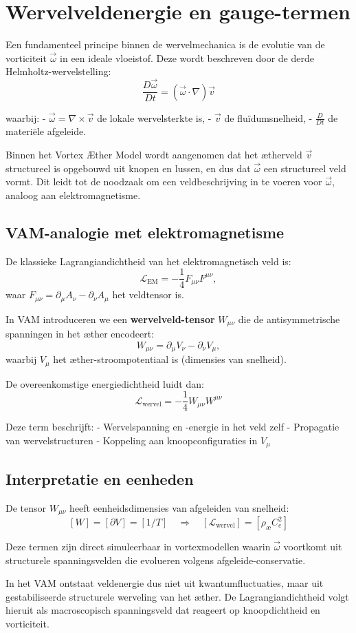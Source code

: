 \section{Wervelveldenergie en gauge-termen}

Een fundamenteel principe binnen de wervelmechanica is de evolutie van de vorticiteit $\vec{\omega}$ in een ideale vloeistof. Deze wordt beschreven door de derde Helmholtz-wervelstelling:
\[
    \frac{D \vec{\omega}}{Dt} = (\vec{\omega} \cdot \nabla) \vec{v}
\]

waarbij:
- $\vec{\omega} = \nabla \times \vec{v}$ de lokale wervelsterkte is,
- $\vec{v}$ de fluïdumsnelheid,
- $\frac{D}{Dt}$ de materiële afgeleide.

Binnen het Vortex Æther Model wordt aangenomen dat het ætherveld $\vec{v}$ structureel is opgebouwd uit knopen en lussen, en dus dat $\vec{\omega}$ een structureel veld vormt. Dit leidt tot de noodzaak om een veldbeschrijving in te voeren voor $\vec{\omega}$, analoog aan elektromagnetisme.

\subsection*{VAM-analogie met elektromagnetisme}
De klassieke Lagrangiandichtheid van het elektromagnetisch veld is:
\[
    \mathcal{L}_\text{EM} = -\frac{1}{4} F_{\mu\nu} F^{\mu\nu},
\]
waar $F_{\mu\nu} = \partial_\mu A_\nu - \partial_\nu A_\mu$ het veldtensor is.

In VAM introduceren we een \textbf{wervelveld-tensor} $W_{\mu\nu}$ die de antisymmetrische spanningen in het æther encodeert:
\[
    W_{\mu\nu} = \partial_\mu V_\nu - \partial_\nu V_\mu,
\]
waarbij $V_\mu$ het æther-stroompotentiaal is (dimensies van snelheid).

De overeenkomstige energiedichtheid luidt dan:
\[
    \mathcal{L}_\text{wervel} = -\frac{1}{4} W_{\mu\nu} W^{\mu\nu}
\]

Deze term beschrijft:
- Wervelspanning en -energie in het veld zelf
- Propagatie van wervelstructuren
- Koppeling aan knoopconfiguraties in $V_\mu$

\subsection*{Interpretatie en eenheden}
De tensor $W_{\mu\nu}$ heeft eenheidsdimensies van afgeleiden van snelheid:
\[
    [W] = [\partial V] = [1/T] \quad \Rightarrow \quad [\mathcal{L}_\text{wervel}] = [\rho_\text{\ae} C_e^2]
\]

Deze termen zijn direct simuleerbaar in vortexmodellen waarin $\vec{\omega}$ voortkomt uit structurele spanningsvelden die evolueren volgens afgeleide-conservatie.

In het VAM ontstaat veldenergie dus niet uit kwantumfluctuaties, maar uit gestabiliseerde structurele werveling van het æther. De Lagrangiandichtheid volgt hieruit als macroscopisch spanningsveld dat reageert op knoopdichtheid en vorticiteit.
